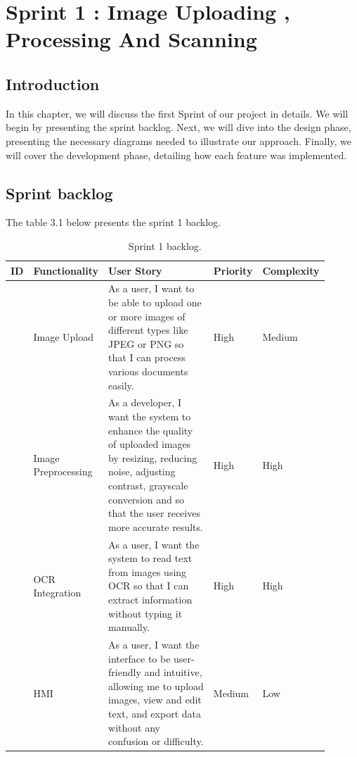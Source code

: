\chapter{Sprint 1 : Image Uploading , Processing And Scanning }
\label{ch::chapter4}

\section{Introduction}
In this chapter, we will discuss the first Sprint of our project in details. We will begin by presenting the sprint backlog. Next, we will dive into the design phase, presenting the necessary diagrams needed to illustrate our approach. Finally, we will cover the development phase, detailing how each feature was implemented.

\section{Sprint backlog}
The table 3.1 below presents the sprint 1 backlog.
\begin{table}[!htpb]
    \caption{Sprint 1 backlog.}
    \centering
    \begin{tabular}{|>{\centering\arraybackslash}m{0.05\linewidth}|>{\centering\arraybackslash}m{0.15\linewidth}|>{\centering\arraybackslash}m{0.45\linewidth}|>{\centering\arraybackslash}m{0.1\linewidth}|>{\centering\arraybackslash}m{0.15\linewidth}|} \hline 
    \textbf{ID} & \textbf{Functionality} & \textbf{User Story} & \textbf{Priority} & \textbf{Complexity} \\ \hline
         1 & Image Upload & As a user, I want to be able to upload one or more images of different types like JPEG or PNG so that I can process various documents easily. & High & Medium\\ \hline 
         2 & Image Preprocessing & As a developer, I want the system to enhance the quality of uploaded images by resizing, reducing noise, adjusting contrast, grayscale conversion and so that the user receives more accurate results. & High & High\\ \hline
         3 & OCR Integration & As a user, I want the system to read text from images using OCR so that I can extract information without typing it manually. & High & High\\ \hline
         4 & HMI & As a user, I want the interface to be user-friendly and intuitive, allowing me to upload images, view and edit text, and export data without any confusion or difficulty. & Medium & Low\\ \hline
    \end{tabular}
    
    \label{tab:sprint1_backlog}
\end{table}
\newpage


